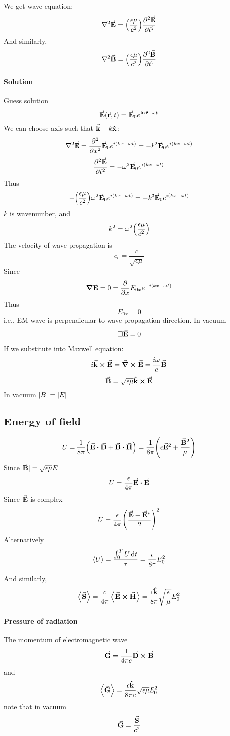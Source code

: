 We get wave equation:$$\laplacian{\va{E}} = \qty(\frac{\epsilon \mu}{c^2}) \pdv[2]{\va{E}}{t}$$
And similarly,
$$\laplacian{\va{B}} = \qty(\frac{\epsilon \mu}{c^2}) \pdv[2]{\va{B}}{t}$$
\paragraph{Solution}
Guess solution
$$\va{E}(\va{r}, t) = \va{E}_0 e^{\va{k} \vdot \va{r} - \omega t}$$
We can choose axis such that $\va{k} - k \vu{x}$:
$$\laplacian{\va{E}} = \pdv[2]{x} \va{E}_0 e^{i(kx-\omega t)} = -k^2\va{E}_0 e^{i(kx-\omega t)}$$
$$\pdv[2]{\va{E}}{t} = -\omega^2 \va{E}_0 e^{i(kx-\omega t)}$$
Thus
$$-\qty(\frac{\epsilon \mu}{c^2})\omega^2 \va{E}_0 e^{i(kx-\omega t)} = -k^2\va{E}_0 e^{i(kx-\omega t)}$$
$k$ is wavenumber, and
$$k^2 = \omega^2 \qty(\frac{\epsilon \mu}{c^2})$$
The velocity of wave propagation is
$$c_\epsilon = \frac{c}{\sqrt{\epsilon \mu}}$$
Since
$$\grad{\va{E}} = 0 = \pdv{x}E_{0x}e^{-i(kx - \omega t)}$$
Thus
$$E_{0x} = 0$$
i.e., EM wave is perpendicular to wave propagation direction.
In vacuum
$$\Box \va{E} = 0$$

If we substitute into Maxwell equation:
$$ i\va{k} \cross \va{E}  = \curl{\va{E}} = \frac{i\omega }{c}  \va{B}$$
$$\va{B} = \sqrt{\epsilon \mu} \vu{k} \cross \va{E}$$
In vacuum $\abs{B} = \abs{E}$ 
\subsection{Energy of field}
$$U = \frac{1}{8\pi} \qty(\va{E} \vdot \va{D} + \va{B} \vdot \va{H}) = \frac{1}{8\pi} \qty(\epsilon\va{E}^2 + \frac{\va{B}^2}{\mu}) $$
Since $\va{B}] = \sqrt{\epsilon \mu} E$
$$U = \frac{\epsilon}{4\pi} \va{E} \vdot \va{E} $$
Since $\va{E}$ is complex
$$U = \frac{\epsilon}{4\pi} \qty(\frac{\va{E}+\va{E}^*}{2})^2$$
Alternatively
$$\expval{U} = \frac{\int_0^T U \dd{t}}{\tau} = \frac{\epsilon }{8\pi} E_0^2$$

And similarly,
$$\expval{\va{S}} = \frac{c}{4\pi} \expval{\va{E} \cross \va{H}} = \frac{c\vu{k}}{8\pi} \sqrt{\frac{\epsilon}{\mu}} E_0^2$$
\paragraph{Pressure of radiation}
The momentum of electromagnetic wave
$$\va{G} = \frac{1}{4\pi c} \va{D} \cross \va{B}$$
and
$$\expval{\va{G}} = \frac{\epsilon\vu{k}}{8\pi c} \sqrt{\epsilon \mu} E_0^2$$
note that in vacuum
$$\va{G} = \frac{\va{S}}{c^2}$$
